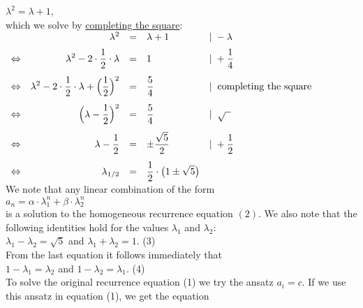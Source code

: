 $\lambda^2 = \lambda + 1$,
\\[0.2cm]
which we solve by \href{https://en.wikipedia.org/wiki/Completing_the_square}{completing the square}:
\\[0.2cm]
\hspace*{1.3cm}
$\begin{array}{lrcll}
                &  \lambda^2 & = & \lambda + 1 & |\;- \lambda \\[0.2cm]
\Leftrightarrow & \displaystyle \lambda^2 - 2 \cdot \frac{1}{2} \cdot\lambda & = & 1 & |\;\displaystyle+ \frac{1}{4} \\[0.4cm]
\Leftrightarrow & \displaystyle \lambda^2 - 2 \cdot \frac{1}{2} \cdot\lambda + \Big(\frac{1}{2}\Big)^2 & = & \displaystyle\frac{5}{4}
                & | \;\; \mbox{completing the square}
                  \\[0.4cm]
\Leftrightarrow & \displaystyle \Big(\lambda -\frac{1}{2}\Big)^2 & = & \displaystyle\frac{5}{4}         & | \;\;\sqrt{\;\;} \\[0.4cm]
\Leftrightarrow & \displaystyle \lambda -\frac{1}{2} & = & \displaystyle\pm\frac{\sqrt{5}}{2} & | \displaystyle\;+ \frac{1}{2} \\[0.4cm]
\Leftrightarrow & \displaystyle \lambda_{1/2} & = & \displaystyle\frac{1}{2} \cdot \bigl(1 \pm \sqrt{5}\bigr) & 
 \end{array}
 $
\\[0.2cm]
We note that any linear combination of the form
\\[0.2cm]
\hspace*{1.3cm}
$a_n = \alpha \cdot \lambda_1^n + \beta \cdot \lambda_2^n$
\\[0.2cm]
is a solution to the homogeneous recurrence equation $(2)$.
We also note that the following identities hold for the values $\lambda_1$ and $\lambda_2$:
\\[0.2cm]
\hspace*{1.3cm} 
$\lambda_1 - \lambda_2 = \sqrt{5}$ \quad and \quad $\lambda_1 + \lambda_2 = 1$. \hspace*{\fill} (3)
\\[0.2cm]
From the last equation it follows immediately that \\[0.2cm]
\hspace*{1.3cm} $1 - \lambda_1 = \lambda_2$ \quad and \quad $1 - \lambda_2 = \lambda_1$. \hspace*{\fill} (4)
\\[0.1cm]
To solve the original recurrence equation (1) we try the ansatz
$a_i = c$.  If we use this ansatz in equation (1), we get the equation \\[0.2cm]
\hspace*{1.3cm}
